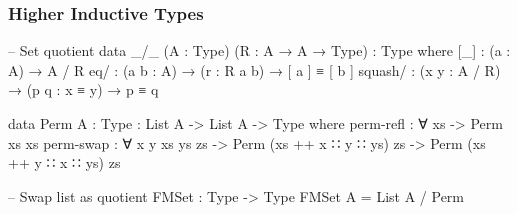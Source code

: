 \documentclass{beamer}
\begin{document}
\begin{frame}[fragile]
\frametitle{Higher Inductive Types}

\begin{code}
-- Set quotient
data _/_ (A : Type) (R : A → A → Type) : Type where
  [_] : (a : A) → A / R
  eq/ : (a b : A) → (r : R a b) → [ a ] ≡ [ b ]
  squash/ : (x y : A / R) → (p q : x ≡ y) → p ≡ q

data Perm {A : Type} : List A -> List A -> Type where
  perm-refl : ∀ {xs} -> Perm xs xs
  perm-swap : ∀ {x y xs ys zs}
    -> Perm (xs ++ x ∷ y ∷ ys) zs
    -> Perm (xs ++ y ∷ x ∷ ys) zs

-- Swap list as quotient
FMSet : Type -> Type
FMSet A = List A / Perm
\end{code}

\end{frame}
\end{document}
